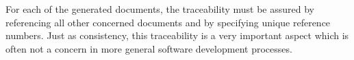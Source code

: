 For each of the generated documents, the traceability must be assured by
referencing all other concerned documents and by specifying unique reference
numbers. Just as consistency, this traceability is a very important aspect which
is often not a concern in more general software development processes.




